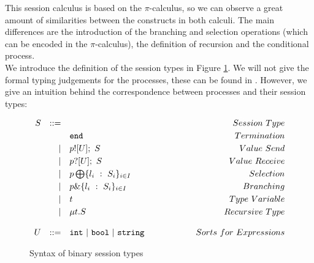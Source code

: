\documentclass[12pt,twoside]{report}
\newcommand{\comment}[1]{}
\newcommand{\white}{\ \ \ \ \ \ \ \ \ \ \ \ }
\begin{document}
This session calculus is based on the $\pi$-calculus, so we can observe a great amount of similarities between the constructs in both calculi. The main differences are the introduction of the branching and selection operations (which can be encoded in the $\pi$-calculus), the definition of recursion and the conditional process. \\


We introduce the definition of the session types in Figure \ref{bst_session_types}. We will not give the formal typing judgements for the processes, these can be found in \cite{co406, binarysessiontypes1, subtyping}\comment{Course material ref and possibly language primitives}. However, we give an intuition behind the correspondence between processes and their session types:

\begin{figure}[h]
    \centering
    \begin{equation*}
    \centering
    \begin{array}{rrlcr}
        S & ::= && \white & Session\ Type \\[2.75pt]
             &   & \texttt{end} & \white & Termination  \\[2.75pt]
             & | & p![U];\ S & \white & Value\ Send \\[2.75pt]
             & | & p?[U];\ S & \white & Value\ Receive \\[2.75pt]
             & | & p \bigoplus \{l_i\ :\ S_i\}_{i \in I} & \white& Selection \\[2.75pt]
             & | & p \& \{l_i\ :\ S_i\}_{i \in I} & \white & Branching \\[2.75pt] 
             & | & t & \white & Type\ Variable \\[2.75pt]
             & | & \mu t.S & \white & Recursive\ Type\\\\
        U & ::= & \texttt{int}\ |\ \texttt{bool}\ |\ \texttt{string}& \white & Sorts\ for\ Expressions
        \end{array}
    \end{equation*}
    \caption{Syntax of binary session types}
    \label{bst_session_types}
\end{figure}{}
\end{document}

